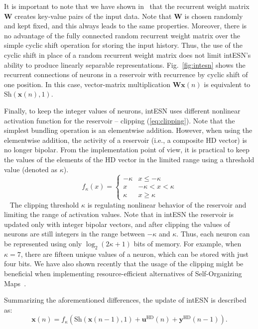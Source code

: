 It is important to note that we have shown in~\cite{Frady17} that the recurrent weight matrix $\textbf{W}$ creates key-value pairs of the input data.
Note that $\textbf{W}$ is chosen randomly and kept fixed, and this always leads to the same properties.
Moreover, there is no advantage of the fully connected random recurrent weight matrix over the simple cyclic shift operation for storing the input history.
Thus, the use of the cyclic shift in place of a random  recurrent weight matrix does not limit intESN's ability to produce linearly separable representations. 
Fig.~\ref{fig:intesn} shows the recurrent connections of neurons in a reservoir with recurrence by cyclic shift of one position. In this case, vector-matrix multiplication $ \textbf{W} \textbf{x}(n) $ is equivalent to $ \text{Sh}(\textbf{x}(n),1)$.   




Finally, to keep the integer values of neurons, intESN uses different nonlinear activation function for the reservoir -- clipping (\ref{eq:clipping}).
Note that the simplest bundling operation is an elementwise addition. However, when using the elementwise
addition, the activity of a reservoir (i.e., a composite HD vector) is no longer bipolar. From the implementation
point of view, it is practical to keep the values of the elements of the HD vector in the limited range using  a threshold value (denoted as $\kappa$). %
~
\begin{equation}
f_\kappa (x) = 
\begin{cases}
-\kappa & x \leq -\kappa \\
x & -\kappa < x < \kappa \\
\kappa & x \geq \kappa
\end{cases}
\label{eq:clipping}
\end{equation}
~
The clipping threshold $\kappa$ is regulating nonlinear behavior of the reservoir and limiting the range of activation values. Note that in intESN the reservoir is updated only with integer bipolar vectors, and after clipping the values of neurons are still integers in the range between $-\kappa$ and $\kappa$. Thus, each neuron can be represented using only $\log_2(2\kappa+1)$ bits of memory. For example, when $\kappa=7$, there are fifteen unique values of a neuron, which can be stored with just four bits. 
We have also shown recently that the usage of the clipping might be beneficial when implementing resource-efficient alternatives of Self-Organizing Maps~\cite{intSOM}.


Summarizing the aforementioned differences, the update of intESN is described as: 
~
\begin{equation}
\textbf{x}(n)= f_\kappa (\text{Sh}(\textbf{x}(n-1),1)+\textbf{u}^{\text{HD}}(n)+\textbf{y}^{\text{HD}}(n-1)).
\label{eq:intesnres}
 \end{equation}












